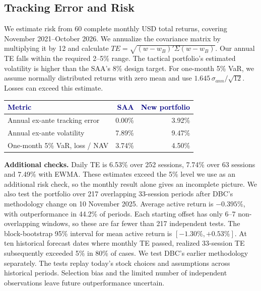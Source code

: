\documentclass[10pt,a4paper]{article}
\newcommand{\hd}[1]{\textcolor{navy}{\textbf{#1}}}
\begin{document}
\subsection{Tracking Error and Risk}
We estimate risk from 60 complete monthly USD total returns, covering November 2021--October 2026. We annualize the covariance matrix by multiplying it by 12 and calculate $TE=\sqrt{(w-w_B)'\Sigma(w-w_B)}$. Our annual TE falls within the required 2--5\% range. The tactical portfolio's estimated volatility is higher than the SAA's 8\% design target. For one-month 5\% VaR, we assume normally distributed returns with zero mean and use $1.645\,\sigma_{ann}/\sqrt{12}$. Losses can exceed this estimate.
\begin{center}\small
\begin{tabular}{lrr}\toprule
\hd{Metric} & \hd{SAA} & \hd{New portfolio} \\\midrule
Annual ex-ante tracking error & 0.00\% & 3.92\% \\
Annual ex-ante volatility & 7.89\% & 9.47\% \\
One-month 5\% VaR, loss / NAV & 3.74\% & 4.50\% \\\bottomrule
\end{tabular}\end{center}

\begin{center}
\end{center}

\textbf{Additional checks.} Daily TE is 6.53\% over 252 sessions, 7.74\% over 63 sessions and 7.49\% with EWMA. These estimates exceed the 5\% level we use as an additional risk check, so the monthly result alone gives an incomplete picture. We also test the portfolio over 217 overlapping 33-session periods after DBC's methodology change on 10 November 2025. Average active return is $-0.395\%$, with outperformance in 44.2\% of periods. Each starting offset has only 6--7 non-overlapping windows, so these are far fewer than 217 independent tests. The block-bootstrap 95\% interval for mean active return is $[-1.30\%,+0.53\%]$. At ten historical forecast dates where monthly TE passed, realized 33-session TE subsequently exceeded 5\% in 80\% of cases. We test DBC's earlier methodology separately. The tests replay today's stock choices and assumptions across historical periods. Selection bias and the limited number of independent observations leave future outperformance uncertain.
\end{document}
